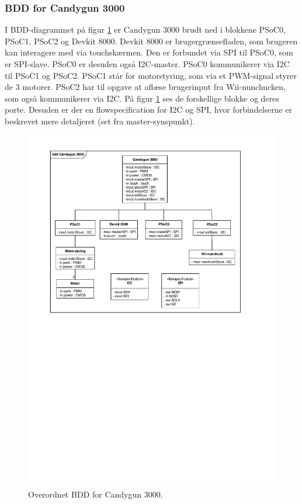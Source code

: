 \subsubsection{BDD for Candygun 3000}
I BDD-diagrammet på figur \ref{fig:BDD} er Candygun 3000 brudt ned i blokkene PSoC0, PSoC1, PSoC2 og Devkit 8000. Devkit 8000 er brugergrænsefladen, som brugeren kan interagere med via touchskærmen. Den er forbundet via SPI til PSoC0, som er SPI-slave. PSoC0 er desuden også I2C-master. PSoC0 kommunikerer via I2C til PSoC1 og PSoC2. PSoC1 står for motorstyring, som via et PWM-signal styrer de 3 motorer. PSoC2 har til opgave at aflæse brugerinput fra Wii-nunchucken, som også kommunikerer via I2C. På figur \ref{fig:BDD} ses de forskellige blokke og deres porte. Desuden er der en flowspecification for I2C og SPI, hvor forbindelserne er beskrevet mere detaljeret (set fra master-synspunkt). 

\begin{figure}[H]
	\centering
	\includegraphics[trim = {1.8cm 14.6cm 1.8cm 1cm}, clip = true, width = \textwidth]{Systemarkitektur/images/BDD_overordnet.pdf}
	\caption{Overordnet BDD for Candygun 3000.}
	\label{fig:BDD}
\end{figure}

